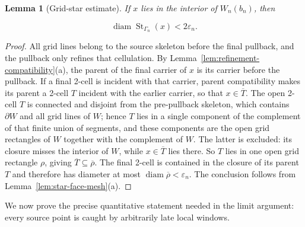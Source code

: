 \documentclass[11pt]{article}
\theoremstyle{mainplain}
\newtheorem{lemma}[theorem]{Lemma}
\theoremstyle{mainroman}
\theoremstyle{definition}
\numberwithin{equation}{section}
\begin{document}
\begin{lemma}[Grid-star estimate]\label{lem:grid-star-estimate}
If \(x\) lies in the interior of \(W_n(b_n)\), then

\[
\operatorname{diam}
 \operatorname{St}_{\Gamma_n}(x)
 <2\varepsilon_n.
\]
\end{lemma}
\begin{proof}
All grid lines belong to the source skeleton before the final pullback,
and the pullback only refines that cellulation. By
Lemma~\ref{lem:refinement-compatibility}\textup{(a)}, the parent of the
final carrier of \(x\) is its carrier before the pullback. If a final
2-cell is incident with that carrier, parent compatibility makes its
parent a 2-cell \(T\) incident with the earlier carrier, so that
\(x\in\overline T\). The open 2-cell \(T\) is connected and disjoint
from the pre-pullback skeleton, which contains \(\partial W\) and all
grid lines of \(W\); hence \(T\) lies in a single component of the
complement of that finite union of segments, and these components are
the open grid rectangles of \(W\) together with the complement of
\(W\). The latter is excluded: its closure misses the interior of
\(W\), while \(x\in\overline T\) lies there. So \(T\) lies in one open
grid rectangle \(\rho\), giving \(\overline T\subseteq\overline\rho\).
The final 2-cell is contained in the closure of its parent \(T\) and
therefore has diameter at most
\(\operatorname{diam}\overline\rho<\varepsilon_n\). The conclusion follows from
Lemma~\ref{lem:star-face-mesh}\textup{(a)}.
\end{proof}

We now prove the precise quantitative statement needed in the limit
argument: every source point is caught by arbitrarily late local
windows.
\end{document}
